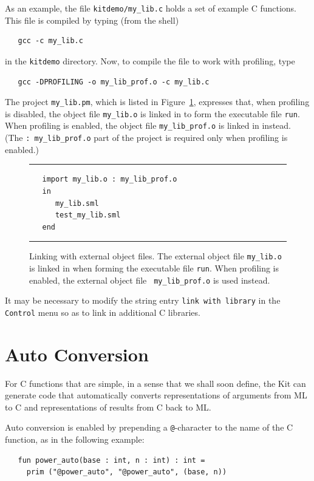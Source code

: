 \documentclass[12pt]{book}
\begin{document}
As an example, the file \verb|kitdemo/my_lib.c| holds a set of example
C functions. This file is compiled by typing (from the shell)
\begin{verbatim}
   gcc -c my_lib.c
\end{verbatim}
in the {\tt kitdemo} directory. Now, to compile the file to work with
profiling, type
\begin{verbatim}
   gcc -DPROFILING -o my_lib_prof.o -c my_lib.c
\end{verbatim}

The project \verb|my_lib.pm|, which is listed in Figure~\ref{my_lib.pm.fig},
expresses that, when profiling is disabled, the object file
\verb|my_lib.o| is linked in to form the executable file {\tt run}.
When profiling is enabled, the object file \verb|my_lib_prof.o| is
linked in instead. (The \verb|: my_lib_prof.o| part of the project is
required only when profiling is enabled.)
\begin{figure}
\hrule \medskip
\begin{verbatim}
   import my_lib.o : my_lib_prof.o
   in 
      my_lib.sml 
      test_my_lib.sml
   end
\end{verbatim}
\caption{Linking with external object files. The external object 
  file {\tt my\_lib.o} is linked in when forming the executable file
  {\tt run}. When profiling is enabled, the external object file {\tt
    my\_lib\_prof.o} is used instead.}
\label{my_lib.pm.fig}
\medskip \hrule
\end{figure}

It may be necessary to modify the string entry \texttt{link with
  library} in the {\tt Control} menu so as to link in additional C
libraries.

\section{Auto Conversion} 
% 
For C functions that are simple, in a sense
that we shall soon define, the Kit can generate code that
automatically converts representations of arguments from ML to C and
representations of results from C back to ML.

Auto conversion is enabled by prepending a {\tt @}-character to
the name of the C function, as in the following example:
\begin{verbatim}
   fun power_auto(base : int, n : int) : int = 
     prim ("@power_auto", "@power_auto", (base, n))
\end{verbatim}
\end{document}

